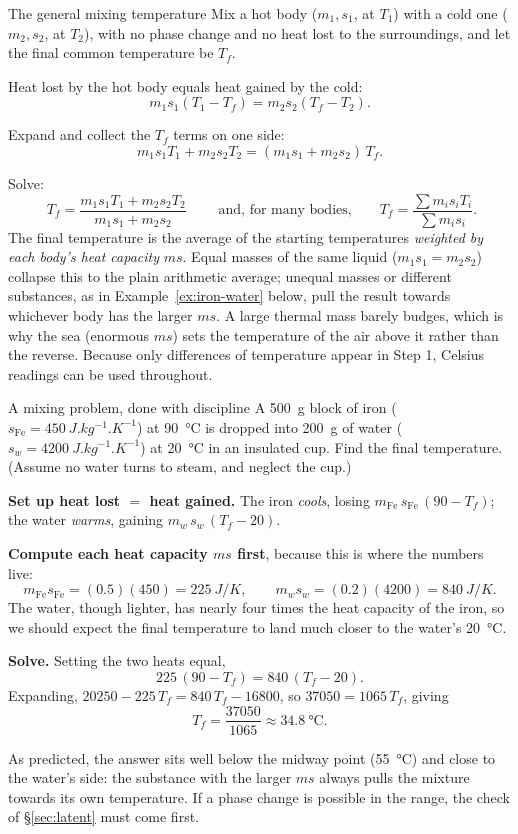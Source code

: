 \begin{derivbox}{The general mixing temperature}
Mix a hot body ($m_1, s_1$, at $T_1$) with a cold one ($m_2, s_2$, at $T_2$), with no phase change and
no heat lost to the surroundings, and let the final common temperature be $T_f$.

 Heat lost by the hot body equals heat gained by the cold:
\[
m_1 s_1 (T_1 - T_f) = m_2 s_2 (T_f - T_2).
\]

 Expand and collect the $T_f$ terms on one side:
\[
m_1 s_1 T_1 + m_2 s_2 T_2 = (m_1 s_1 + m_2 s_2)\,T_f .
\]

 Solve:
\[
\boxed{\;T_f = \frac{m_1 s_1 T_1 + m_2 s_2 T_2}{m_1 s_1 + m_2 s_2}\;}
\qquad\text{and, for many bodies,}\qquad
T_f = \frac{\sum m_i s_i T_i}{\sum m_i s_i}.
\]
The final temperature is the average of the starting temperatures \emph{weighted by each body's heat
capacity} $ms$. Equal masses of the same liquid ($m_1s_1 = m_2s_2$) collapse this to the plain
arithmetic average; unequal masses or different substances, as in Example~\ref{ex:iron-water} below,
pull the result towards whichever body has the larger $ms$. A large thermal mass barely budges, which is
why the sea (enormous $ms$) sets the temperature of the air above it rather than the reverse. Because
only differences of temperature appear in Step 1, Celsius readings can be used throughout.
\end{derivbox}

\begin{exbox}{A mixing problem, done with discipline}\label{ex:iron-water}
A \SI{500}{g} block of iron ($s_{\text{Fe}}=\SI{450}{J.kg^{-1}.K^{-1}}$) at \SI{90}{\celsius} is
dropped into \SI{200}{g} of water ($s_w=\SI{4200}{J.kg^{-1}.K^{-1}}$) at \SI{20}{\celsius} in an
insulated cup. Find the final temperature. (Assume no water turns to steam, and neglect the cup.)

 \textbf{Set up heat lost $=$ heat gained.} The iron \emph{cools}, losing
$m_{\text{Fe}}\,s_{\text{Fe}}\,(90 - T_f)$; the water \emph{warms}, gaining $m_w\,s_w\,(T_f - 20)$.

 \textbf{Compute each heat capacity $ms$ first}, because this is where the numbers live:
\[
m_{\text{Fe}}s_{\text{Fe}} = (0.5)(450) = \SI{225}{J/K}, \qquad
m_w s_w = (0.2)(4200) = \SI{840}{J/K}.
\]
The water, though lighter, has nearly four times the heat capacity of the iron, so we should expect the
final temperature to land much closer to the water's \SI{20}{\celsius}.

 \textbf{Solve.} Setting the two heats equal,
\[
225\,(90 - T_f) = 840\,(T_f - 20).
\]
Expanding, $20250 - 225\,T_f = 840\,T_f - 16800$, so $37050 = 1065\,T_f$, giving
\[
T_f = \frac{37050}{1065} \approx \SI{34.8}{\celsius}.
\]

\medskip
As predicted, the answer sits well below the midway point (\SI{55}{\celsius}) and close to the water's
side: the substance with the larger $ms$ always pulls the mixture towards its own temperature. If a
phase change is possible in the range, the check of \S\ref{sec:latent} must come first.
\end{exbox}


